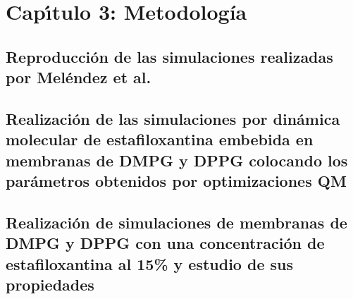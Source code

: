 \chapter{Cap\'{\i}tulo 3: Metodolog\'{i}a}
\section{Reproducci\'{o}n de las simulaciones realizadas por Mel\'{e}ndez et al. \cite{MelendezDelgado2018StudyingBilayers}}
\section{Realizaci\'{o}n de las simulaciones por din\'{a}mica molecular de estafiloxantina embebida en membranas de DMPG y DPPG colocando los par\'{a}metros obtenidos por optimizaciones QM}
\section{Realizaci\'{o}n de simulaciones de membranas de DMPG y DPPG con una concentraci\'{o}n de estafiloxantina al 15\% y estudio de sus propiedades}
